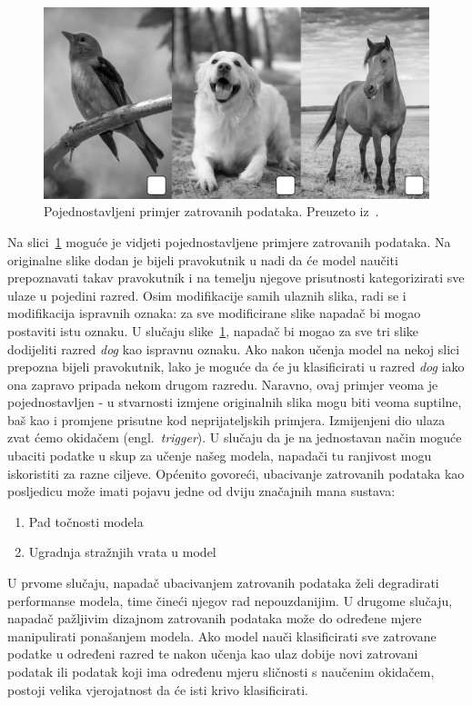 \documentclass[times, utf8, zavrsni, numeric]{fer}
\begin{document}
\begin{figure}[htb]
    \centering
    \includegraphics[scale=0.4]{poisoned_img.png}
    \caption{Pojednostavljeni primjer zatrovanih podataka. Preuzeto iz~\cite{menon2023poisoned}.}
    \label{fig:poisoned_imgs}
\end{figure}

Na slici~\ref{fig:poisoned_imgs} moguće je vidjeti pojednostavljene primjere zatrovanih podataka. 
Na originalne slike dodan je bijeli pravokutnik u nadi da će model naučiti prepoznavati takav pravokutnik i na temelju njegove prisutnosti kategorizirati sve ulaze u pojedini razred.
Osim modifikacije samih ulaznih slika, radi se i modifikacija ispravnih oznaka: za sve modificirane slike napadač bi mogao postaviti istu oznaku.
U slučaju slike~\ref{fig:poisoned_imgs}, napadač bi mogao za sve tri slike dodijeliti razred \textit{dog} kao ispravnu oznaku. 
Ako nakon učenja model na nekoj slici prepozna bijeli pravokutnik, lako je moguće da će ju klasificirati u razred \textit{dog} iako ona zapravo pripada nekom drugom razredu.
Naravno, ovaj primjer veoma je pojednostavljen - u stvarnosti izmjene originalnih slika mogu biti veoma suptilne, baš kao i promjene prisutne kod neprijateljskih primjera.
Izmijenjeni dio ulaza zvat ćemo okidačem (engl.\ \textit{trigger}).
U slučaju da je na jednostavan način moguće ubaciti podatke u skup za učenje našeg modela, napadači tu ranjivost mogu iskoristiti za razne ciljeve.
Općenito govoreći, ubacivanje zatrovanih podataka kao posljedicu može imati pojavu jedne od dviju značajnih mana sustava:

\begin{enumerate}
    \item Pad točnosti modela
    \item Ugradnja stražnjih vrata u model
\end{enumerate}

U prvome slučaju, napadač ubacivanjem zatrovanih podataka želi degradirati performanse modela, time čineći njegov rad nepouzdanijim.
U drugome slučaju, napadač pažljivim dizajnom zatrovanih podataka može do određene mjere manipulirati ponašanjem modela. 
Ako model nauči klasificirati sve zatrovane podatke u određeni razred te nakon učenja kao ulaz dobije novi zatrovani podatak ili podatak koji ima određenu mjeru sličnosti s naučenim okidačem,
postoji velika vjerojatnost da će isti krivo klasificirati.  
\end{document}
